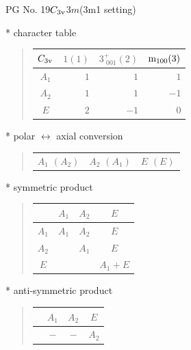 \documentclass[fleqn,8pt,landscape]{jsarticle}
\begin{document}
\setcounter{MaxMatrixCols}{32}

\renewcommand{\tablename}{Table~}
\renewcommand{\figurename}{Figure~}
\begin{center}
\LARGE
PG No. 19\quad$C_{\rm 3v}$\quad$3m$\quad(3m1 setting)\quad[ trigonal ]
\end{center}

* character table
\begin{quote}
\begin{tabular}{crrr} \hline \hline
$ C_{\rm 3v} $ & $ 1(1) $ & $ 3^{+}_{\,\,001}(2) $ & $ {\rm m}_{100}(3) $ \\ \hline
$ A_{1} $ & $ 1 $ & $ 1 $ & $ 1 $ \\
$ A_{2} $ & $ 1 $ & $ 1 $ & $ -1 $ \\
$ E $ & $ 2 $ & $ -1 $ & $ 0 $ \\
 \hline \hline
\end{tabular}
\end{quote}

* polar $\leftrightarrow$ axial conversion
\begin{quote}
\begin{tabular}{ccc}
$ A_{1}\,\,(A_{2}) $ & $ A_{2}\,\,(A_{1}) $ & $ E\,\,(E) $
\end{tabular}
\end{quote}

* symmetric product
\begin{quote}
\begin{tabular}{c|ccc} \hline \hline
 & $ A_{1} $ & $ A_{2} $ & $ E $ \\ \hline
$ A_{1} $ & $ A_{1} $ & $ A_{2} $ & $ E $ \\
$ A_{2} $ & $  $ & $ A_{1} $ & $ E $ \\
$ E $ & $  $ & $  $ & $ A_{1} + E $ \\
 \hline \hline
\end{tabular}
\end{quote}

* anti-symmetric product
\begin{quote}
\begin{tabular}{cccc} \hline \hline
 & $ A_{1} $ & $ A_{2} $ & $ E $ \\ \hline
$  $ & $ - $ & $ - $ & $ A_{2} $ \\
 \hline \hline
\end{tabular}
\end{quote}
\end{document}
